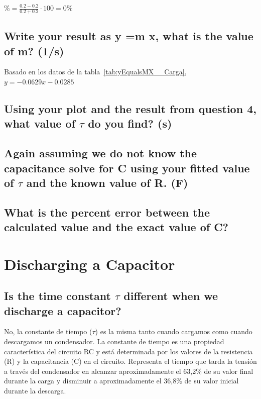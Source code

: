 \documentclass[twocolumn, 12pt]{article}
\begin{document}
$\% = \frac{0.2 - 0.2}{0.2 + 0.2} \cdot 100 = 0\%$

\subsection{Write your result as y =m x, what is the value of m? (1/s)}

Basado en los datos de la tabla~\ref{tab:yEqualsMX__Carga},
$y = -0.0629x -0.0285$

\subsection{Using your plot and the result from question 4, what value of $\tau$ do you find? (s)}

\subsection{Again assuming we do not know the capacitance solve for C using your fitted value of $\tau$
    and the known value of R. (F)}

\subsection{What is the percent error between the calculated value and the exact value of C?}

\section{Discharging a Capacitor}

\subsection{Is the time constant $\tau$ different when we discharge a capacitor?}

No, la constante de tiempo ($\tau$) es la misma tanto
cuando cargamos como cuando descargamos un condensador. La
constante de tiempo es una propiedad característica del
circuito RC y está determinada por los valores de la
resistencia (R) y la capacitancia (C) en el circuito.
Representa el tiempo que tarda la tensión a través del
condensador en alcanzar aproximadamente el 63,2\% de su
valor final durante la carga y disminuir a aproximadamente
el 36,8\% de su valor inicial durante la descarga.
\end{document}
